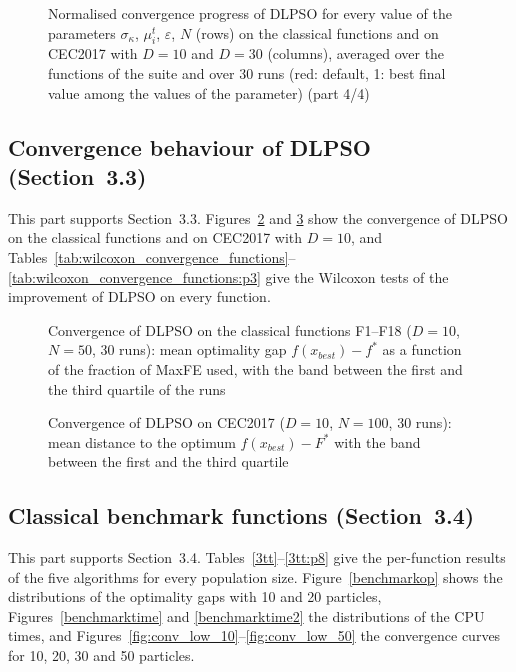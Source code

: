 \begin{figure}[!htbp]
    \centering
    \caption{Normalised convergence progress of DLPSO for every value of the parameters $\sigma_\kappa$, $\mu_i^t$, $\varepsilon$, $N$ (rows) on the classical functions and on CEC2017 with $D=10$ and $D=30$ (columns), averaged over the functions of the suite and over 30 runs (red: default, 1: best final value among the values of the parameter) (part 4/4)}
    \label{fig:sens_convergence_4}
\end{figure}

\FloatBarrier
\subsection{Convergence behaviour of DLPSO (Section~3.3)}\label{app:conv}
This part supports Section~3.3. Figures~\ref{fig:conv_classical} and \ref{fig:conv_cec10} show the convergence of DLPSO on the classical functions and on CEC2017 with $D=10$, and Tables~\ref{tab:wilcoxon_convergence_functions}--\ref{tab:wilcoxon_convergence_functions:p3} give the Wilcoxon tests of the improvement of DLPSO on every function.


\begin{figure}[!htbp]
    \centering
    \caption{Convergence of DLPSO on the classical functions F1--F18 ($D=10$, $N=50$, 30 runs): mean optimality gap $f(x_{best})-f^*$ as a function of the fraction of MaxFE used, with the band between the first and the third quartile of the runs}
    \label{fig:conv_classical}
\end{figure}



\begin{figure}[!htbp]
    \centering
    \caption{Convergence of DLPSO on CEC2017 ($D=10$, $N=100$, 30 runs): mean distance to the optimum $f(x_{best})-F^*$ with the band between the first and the third quartile}
    \label{fig:conv_cec10}
\end{figure}

\FloatBarrier
\subsection{Classical benchmark functions (Section~3.4)}\label{app:low}
This part supports Section~3.4. Tables~\ref{3tt}--\ref{3tt:p8} give the per-function results of the five algorithms for every population size. Figure~\ref{benchmarkop} shows the distributions of the optimality gaps with 10 and 20 particles, Figures~\ref{benchmarktime} and \ref{benchmarktime2} the distributions of the CPU times, and Figures~\ref{fig:conv_low_10}--\ref{fig:conv_low_50} the convergence curves for 10, 20, 30 and 50 particles.


